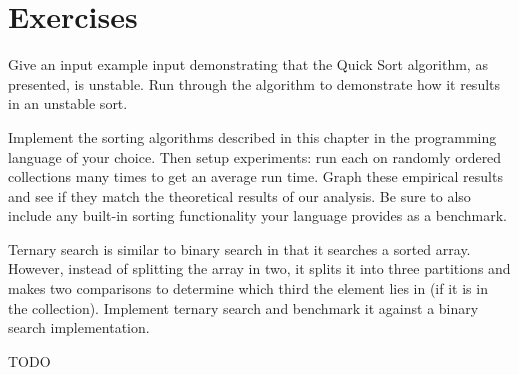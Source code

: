 

\section{Exercises}

\begin{exer}
Give an input example input demonstrating that the Quick Sort algorithm, as 
presented, is unstable.  Run through the algorithm to demonstrate how it 
results in an unstable sort.
\end{exer}


\begin{exer}
Implement the sorting algorithms described in this chapter in the programming
language of your choice.  Then setup experiments: run each on randomly 
ordered collections many times to get an average run time.  Graph these
empirical results and see if they match the theoretical results of
our analysis.  Be sure to also include any built-in sorting functionality
your language provides as a benchmark.
\end{exer}

\begin{exer}
Ternary search is similar to binary search in that it searches a sorted
array.  However, instead of splitting the array in two, it splits it into
three partitions and makes two comparisons to determine which third the
element lies in (if it is in the collection).  Implement ternary search and 
benchmark it against a binary search implementation.
\end{exer}

\begin{exer}
TODO
\end{exer}

